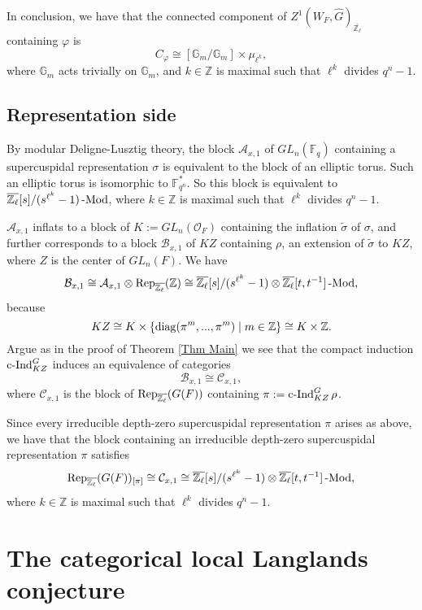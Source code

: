 In conclusion, we have that the connected component of $Z^1(W_F, \hat{G})_{\overline{\mathbb{Z}_{\ell}}}$ containing $\varphi$ is
$$C_{\varphi} \cong [\mathbb{G}_m/\mathbb{G}_m] \times \mu_{\ell^k},$$
where $\mathbb{G}_m$ acts trivially on $\mathbb{G}_m$, and $k \in \mathbb{Z}$ is maximal such that $\ell^k$ divides $q^n-1$.


\section{Representation side}

By modular Deligne-Lusztig theory, the block $\mathcal{A}_{x,1}$ of $GL_n(\mathbb{F}_q)$ containing a supercuspidal representation $\sigma$ is equivalent to the block of an elliptic torus. Such an elliptic torus is isomorphic to $\mathbb{F}_{q^n}^*$. So this block is equivalent to $\overline{\mathbb{Z}_{\ell}}[s]/(s^{\ell^k}-1)\operatorname{-Mod}$, where $k \in \mathbb{Z}$ is maximal such that $\ell^k$ divides $q^n-1$.

$\mathcal{A}_{x,1}$ inflats to a block of $K:=GL_n(\mathcal{O}_F)$ containing the inflation $\tilde{\sigma}$ of $\sigma$, and further corresponds to a block $\mathcal{B}_{x,1}$ of $KZ$ containing $\rho$, an extension of $\tilde{\sigma}$ to $KZ$, where $Z$ is the center of $GL_n(F)$. We have
$$\mathcal{B}_{x,1} \cong \mathcal{A}_{x,1} \otimes \operatorname{\operatorname{Rep}}_{\overline{\mathbb{Z}_{\ell}}}(\mathbb{Z}) \cong \overline{\mathbb{Z}_{\ell}}[s]/(s^{\ell^k}-1) \otimes \overline{\mathbb{Z}_{\ell}}[t, t^{-1}]\operatorname{-Mod},$$
because
$$KZ \cong K \times \{\operatorname{\operatorname{diag}}(\pi^m, ..., \pi^m) \;|\; m \in \mathbb{Z}\} \cong K \times \mathbb{Z}.$$
Argue as in the proof of Theorem \ref{Thm Main} we see that the compact induction $\operatorname{\operatorname{c-Ind}}_{KZ}^G$ induces an equivalence of categories
$$\mathcal{B}_{x,1} \cong \mathcal{C}_{x,1},$$
where $\mathcal{C}_{x,1}$ is the block of $\operatorname{\operatorname{Rep}}_{\overline{\mathbb{Z}_{\ell}}}(G(F))$ containing $\pi:=\operatorname{\operatorname{c-Ind}}_{KZ}^G\rho$.

Since every irreducible depth-zero supercuspidal representation $\pi$ arises as above, we have that the block containing an irreducible depth-zero supercuspidal representation $\pi$ satisfies
$$\operatorname{\operatorname{Rep}}_{\overline{\mathbb{Z}_{\ell}}}(G(F))_{[\pi]} \cong \mathcal{C}_{x,1} \cong \overline{\mathbb{Z}_{\ell}}[s]/(s^{\ell^k}-1) \otimes \overline{\mathbb{Z}_{\ell}}[t, t^{-1}]\operatorname{-Mod},$$
where $k \in \mathbb{Z}$ is maximal such that $\ell^k$ divides $q^n-1$.



\chapter{The categorical local Langlands conjecture} \label{Chapter CLLC}

